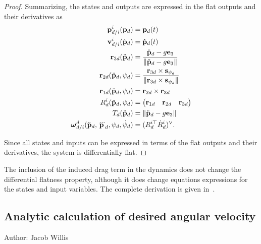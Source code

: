 \begin{proof}
Summarizing, the states and outputs are expressed in the flat outputs and their derivatives as
\begin{align}
\pbf_{d/i}^i(\pbf_d) &= \pbf_d(t) \notag \\
\vbf_{d/i}^i(\dot{\pbf}_d) &= \dot{\pbf}_d(t) \notag \\
\rbf_{3d}(\ddot{\pbf}_d) &= \frac{\ddot{\pbf}_d - g \ebf_3}{\norm{\ddot{\pbf}_d - g \ebf_3}} \notag \\
\rbf_{2d}(\ddot{\pbf}_d, \psi_d) &= \frac{\rbf_{3d} \times \sbf_{\psi_d}}{\norm{\rbf_{3d} \times \sbf_{\psi_d}}} \notag \\
\rbf_{1d}(\ddot{\pbf}_d, \psi_d) &= \rbf_{2d} \times \rbf_{3d} \label{eq:differential_flatness_equations} \\
R_d^i(\ddot{\pbf}_d, \psi_d) &= \begin{pmatrix} \rbf_{1d} & \rbf_{2d} & \rbf_{3d} \end{pmatrix} \notag \\
T_d(\ddot{\pbf}_d) &= \norm{\ddot{\pbf}_d - g \ebf_3} \notag \\	
\omegabf_{d/i}^d(\ddot{\pbf}_d, \dddot{\pbf}_d, \psi_d, \dot{\psi}_d) &= (R_d^{i\top}\dot{R}_d^i)^\vee.\notag 
\end{align}

Since all states and inputs can be expressed in terms of the flat outputs and their derivatives, the system is differentially flat.
\end{proof}

The inclusion of the induced drag term in the dynamics does not change the differential flatness property, although it does change equations expressions for the states and input variables.  The complete derivation is given in~\cite{FaesslerFranchiScaramuzza18.pdf}.


%




\subsection{Analytic calculation of desired angular velocity}
Author: Jacob Willis

